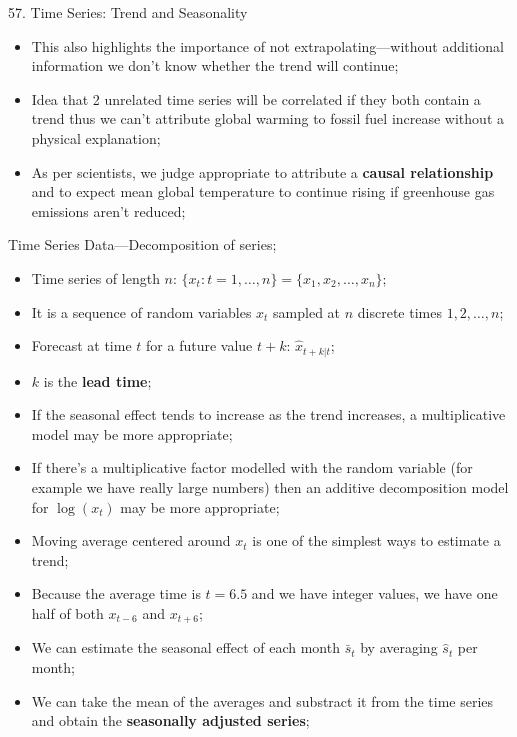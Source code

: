 \begin{CHPT_SUMM_AUTO}[label = {L.-57}]{57. Time Series: Trend and Seasonality}
\begin{description}
\begin{itemize}
		\texttt{[image: src/TS-TREND-SPLIT-PLOTS.png]}
		\item	This also highlights the importance of not extrapolating---without additional information we don't know whether the trend will continue;
		\item	Idea that 2 unrelated time series will be correlated if they both contain a trend thus we can't attribute global warming to fossil fuel increase without a physical explanation;
		\item	As per scientists, we judge appropriate to attribute a \textbf{causal relationship} and to expect mean global temperature to continue rising if greenhouse gas emissions aren't reduced;
		\end{itemize}
	\item[1.5:]	Time Series Data---Decomposition of series;
		\begin{itemize}
	\item	Time series of length $n$: $\{x_{t} : t = 1, \dots, n\} = \{x_{1}, x_{2}, \dots, x_{n}\}$;
	\item[]	It is a sequence of random variables $x_{t}$ sampled at $n$ discrete times $1, 2, \dots, n$;
	\item	Forecast at time $t$ for a future value $t + k$: $\hat{x}_{t + k | t}$;
	\item[]	$k$ is the \textbf{lead time};
		\end{itemize}
		\begin{itemize}
		\item	If the seasonal effect tends to increase as the trend increases, a multiplicative model may be more appropriate;
		\item	If there's a multiplicative factor modelled with the random variable (for example we have really large numbers) then an additive decomposition model for $\log(x_{t})$ may be more appropriate;
		\end{itemize}
		\begin{itemize}
		\item	Moving average centered around $x_{t}$ is one of the simplest ways to estimate a trend;
		\item[]	Because the average time is $t = 6.5$ and we have integer values, we have one half of both $x_{t - 6}$ and $x_{t + 6}$;
		\item	We can estimate the seasonal effect of each month $\bar{s}_{t}$ by averaging $\hat{s}_{t}$ per month;
		\item	We can take the mean of the averages and substract it from the time series and obtain the \textbf{seasonally adjusted series};

\end{itemize}
\end{description}
\end{CHPT_SUMM_AUTO}
